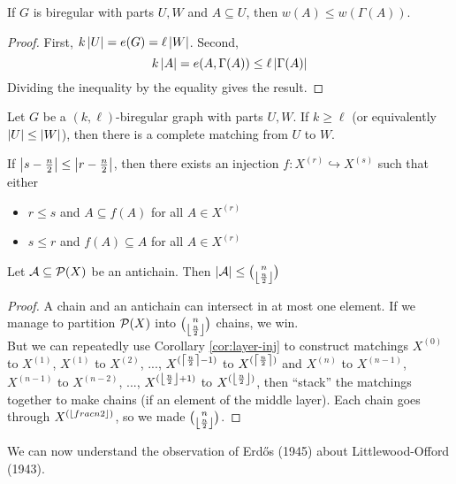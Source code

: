 \documentclass{article}
\begin{document}
\begin{nlemma}\label{lem:weight-biregular}
  If $G$ is biregular with parts $U, W$ and $A \subseteq U$, then $w(A) \le w(\Gamma(A))$.
\end{nlemma}
\begin{proof}
  First, $k\left\lvert U\right\rvert = e(G) = \ell\left\lvert W\right\rvert$. Second,
  $$k\left\lvert A\right\rvert = e(A, \Gamma(A)) \le \ell\left\lvert \Gamma(A)\right\rvert$$
  Dividing the inequality by the equality gives the result.
\end{proof}

\newlec

\begin{ncor}
  Let $G$  be a $(k, \ell)$-biregular graph with parts $U, W$. If $k \ge \ell$ (or equivalently $\left\lvert U\right\rvert \le \left\lvert W\right\rvert$), then there is a complete matching from $U$ to $W$.
\end{ncor}

\begin{ncor}\label{cor:layer-inj}
  If $\left\lvert s - \frac n 2\right\rvert \le \left\lvert r - \frac n 2\right\rvert$, then there exists an injection $f : X^{(r)} \hookrightarrow X^{(s)}$ such that either
  \begin{itemize}
    \item $r \le s$ and $A \subseteq f(A)$ for all $A \in X^{(r)}$
    \item $s \le r$ and $f(A) \subseteq A$ for all $A \in X^{(r)}$
  \end{itemize}
\end{ncor}

\begin{nthm}[Sperner, 1928]
  Let $\mathcal A \subseteq \mathcal P(X)$ be an antichain. Then $\left\lvert \mathcal A\right\rvert \le \binom n{\left\lfloor \frac n 2\right\rfloor}$
\end{nthm}
\begin{proof}
  A chain and an antichain can intersect in at most one element. If we manage to partition $\mathcal P(X)$ into $\binom n{\left\lfloor \frac n 2\right\rfloor}$ chains, we win. \\
  But we can repeatedly use Corollary \ref{cor:layer-inj} to construct matchings $X^{(0)}$ to $X^{(1)}$, $X^{(1)}$ to $X^{(2)}$, ..., $X^{(\left\lceil \frac n 2\right\rceil - 1)}$ to $X^{(\left\lceil \frac n 2\right\rceil)}$ and $X^{(n)}$ to $X^{(n - 1)}$, $X^{(n - 1)}$ to $X^{(n - 2)}$, ..., $X^{(\left\lfloor \frac n 2\right\rfloor + 1)}$ to $X^{(\left\lfloor \frac n 2\right\rfloor)}$, then ``stack'' the matchings together to make chains (if an element of the middle layer). Each chain goes through $X^{(\left\lfloor frac n 2\right\rfloor)}$, so we made $\binom n {\left\lfloor \frac n 2\right\rfloor}$.
\end{proof}

We can now understand the observation of Erd\H os (1945) about Littlewood-Offord (1943).
\end{document}
